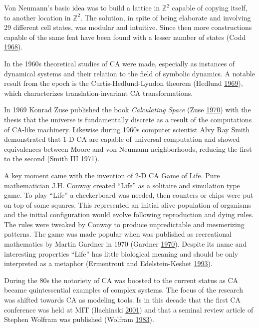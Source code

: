 \documentclass[
  12pt,
  openany]{book}
\begin{document}
Von Neumann's basic idea was to build a lattice in \(\mathds{Z}^2\) capable of copying itself, to another location in \(\mathds{Z}^2\). The solution, in spite of being elaborate and involving 29 different cell states, was modular and intuitive. Since then more constructions capable of the same feat have been found with a lesser number of states (Codd \protect\hyperlink{ref-codd1968cellular}{1968}).

In the 1960s theoretical studies of CA were made, especially as instances of dynamical systems and their relation to the field of symbolic dynamics. A notable result from the epoch is the Curtis-Hedlund-Lyndon theorem (Hedlund \protect\hyperlink{ref-hedlund1969endomorphisms}{1969}), which characterizes translation-invariant CA transformations.

In 1969 Konrad Zuse published the book \emph{Calculating Space} (Zuse \protect\hyperlink{ref-zuse1970calculating}{1970}) with the thesis that the universe is fundamentally discrete as a result of the computations of CA-like machinery. Likewise during 1960s computer scientist Alvy Ray Smith demonstrated that \(1\)-D CA are capable of universal computation and showed equivalences between Moore and von Neumann neighborhoods, reducing the first to the second (Smith III \protect\hyperlink{ref-smith1971simple}{1971}).

A key moment came with the invention of \(2\)-D CA Game of Life. Pure mathematician J.H. Conway created ``Life'' as a solitaire and simulation type game. To play ``Life'' a checkerboard was needed, then counters or chips were put on top of some squares. This represented an initial alive population of organisms and the initial configuration would evolve following reproduction and dying rules. The rules were tweaked by Conway to produce unpredictable and mesmerizing patterns. The game was made popular when was published as recreational mathematics by Martin Gardner in 1970 (Gardner \protect\hyperlink{ref-gardner1970mathematical}{1970}). Despite its name and interesting properties ``Life'' has little biological meaning and should be only interpreted as a metaphor (Ermentrout and Edelstein-Keshet \protect\hyperlink{ref-ermentrout1993cellular}{1993}).

During the 80s the notoriety of CA was boosted to the current status as CA became quintessential examples of complex systems. The focus of the research was shifted towards CA as modeling tools. Is in this decade that the first CA conference was held at MIT (Ilachinski \protect\hyperlink{ref-ilachinski2001cellular}{2001}) and that a seminal review article of Stephen Wolfram was published (Wolfram \protect\hyperlink{ref-wolfram1983statistical}{1983}).
\end{document}
